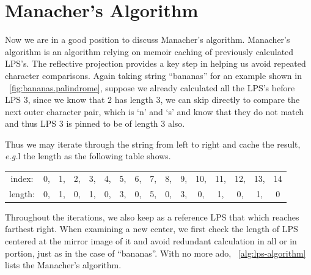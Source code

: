 \documentclass[oneside,11pt]{book}
\theoremstyle{definition}
\theoremstyle{remark}
\begin{document}
\section{Manacher's Algorithm}\label{sec:manacherAlgorithm}

Now we are in a good position to discuss Manacher's algorithm.
Manacher's algorithm is an algorithm relying on memoir caching of previously calculated LPS's.
The reflective projection provides a key step in helping us avoid repeated character comparisons.
Again taking string ``bananas'' for an example shown in ~\autoref{fig:bananas.palindrome},
suppose we already calculated all the LPS's before LPS $3$, since we know that $2$ has
length $3$, we can skip directly to compare the next outer character pair, which is `n' and `s'
and know that they do not match and thus LPS $3$ is pinned to be of length $3$ also.


Thus we may iterate through the string from left to right and cache the result, \textit{e.g.}l
the length as the following table shows.
\begin{center}
    \begin{tabular}{cccccccccccccccc}
        index:&0,&1,&2,&3,&4,&5,&6,&7,&8,&9,&10,&11,&12,&13,&14\\
        length:&0,&1,&0,&1,&0,&3,&0,&5,&0,&3,&0,&1,&0,&1,&0
    \end{tabular}
\end{center}
Throughout the iterations, we also keep as a reference LPS that which reaches farthest right.
When examining a new center, we first check the length of LPS centered at the mirror image of it
and avoid redundant calculation in all or in portion, just as in the case of ``bananas''.
With no more ado, ~\autoref{alg:lps-algorithm} lists the Manacher's algorithm.
\end{document}

